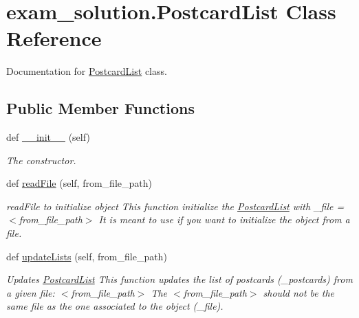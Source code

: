 \hypertarget{classexam__solution_1_1PostcardList}{}\section{exam\+\_\+solution.\+Postcard\+List Class Reference}
\label{classexam__solution_1_1PostcardList}


Documentation for \mbox{\hyperlink{classexam__solution_1_1PostcardList}{Postcard\+List}} class.  


\subsection*{Public Member Functions}
\begin{DoxyCompactItemize}
\item 
\mbox{\label{classexam__solution_1_1PostcardList_aa46a40afb5856e1b65bd29aee36a4c24}} 
def \mbox{\hyperlink{classexam__solution_1_1PostcardList_aa46a40afb5856e1b65bd29aee36a4c24}{\+\_\+\+\_\+init\+\_\+\+\_\+}} (self)
\begin{DoxyCompactList}\small\item\em The constructor. \end{DoxyCompactList}\item 
def \mbox{\hyperlink{classexam__solution_1_1PostcardList_a6557eef9090b67d4b680be50b99e7fcd}{read\+File}} (self, from\+\_\+file\+\_\+path)
\begin{DoxyCompactList}\small\item\em read\+File to initialize object This function initialize the \mbox{\hyperlink{classexam__solution_1_1PostcardList}{Postcard\+List}} with \+\_\+file = $<$from\+\_\+file\+\_\+path$>$ It is meant to use if you want to initialize the object from a file. \end{DoxyCompactList}\item 
def \mbox{\hyperlink{classexam__solution_1_1PostcardList_aea8bf1e9f97027f792b4f0d7b6ca6e55}{update\+Lists}} (self, from\+\_\+file\+\_\+path)
\begin{DoxyCompactList}\small\item\em Updates \mbox{\hyperlink{classexam__solution_1_1PostcardList}{Postcard\+List}} This function updates the list of postcards (\+\_\+postcards) from a given file\+: $<$from\+\_\+file\+\_\+path$>$ The $<$from\+\_\+file\+\_\+path$>$ should not be the same file as the one associated to the object (\+\_\+file). \end{DoxyCompactList}\item 

\end{DoxyCompactItemize}
